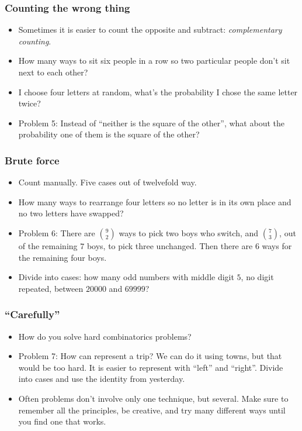 \documentclass[10pt,paper=letter]{scrartcl}
\begin{document}
\subsubsection*{Counting the wrong thing}

\begin{itemize}
  \item Sometimes it is easier to count the opposite and subtract: \emph{complementary counting}.
  \item How many ways to sit six people in a row so two particular people don't sit next to each other?
  \item I choose four letters at random, what's the probability I chose the same letter twice?
  \item Problem 5: Instead of ``neither is the square of the other'', what about the probability one of them is the square of the other?
\end{itemize}

\subsubsection*{Brute force}


\begin{itemize}
  \item Count manually. Five cases out of twelvefold way.
  \item How many ways to rearrange four letters so no letter is in its own place and no two letters have swapped?
  \item Problem 6: There are $\binom{9}{2}$ ways to pick two boys who switch, and $\binom{7}{3}$, out of the remaining $7$ boys, to pick three unchanged. Then there are $6$ ways for the remaining four boys. 
  \item Divide into cases: how many odd numbers with middle digit $5$, no digit repeated, between $20000$ and $69999$?
\end{itemize}

\subsubsection*{``Carefully''}

\begin{itemize}
  \item How do you solve hard combinatorics problems?
  \item Problem 7: How can represent a trip? We can do it using towns, but that would be too hard. It is easier to represent with ``left'' and ``right''. Divide into cases and use the identity from yesterday.
  \item Often problems don't involve only one technique, but several. Make sure to remember all the principles, be creative, and try many different ways until you find one that works.
\end{itemize}
\end{document}
